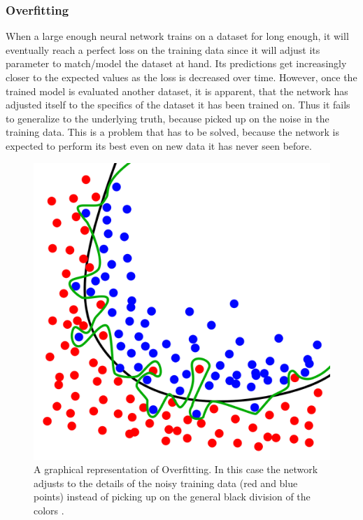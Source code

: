 \documentclass[a4paper,10pt]{scrartcl}
\begin{document}
\subsubsection*{Overfitting}

When a large enough neural network trains on a dataset for long enough, it will eventually reach a perfect loss on the training data since it will adjust its parameter to match/model the dataset at hand.
Its predictions get increasingly closer to the expected values as the loss is decreased over time.
However, once the trained model is evaluated another dataset, it is apparent, that the network has adjusted itself to the specifics of the dataset it has been trained on.
Thus it fails to generalize to the underlying truth, because picked up on the noise in the training data.
This is a problem that has to be solved, because the network is expected to perform its best even on new data it has never seen before.

\begin{figure}[h]
    \includegraphics[scale=0.15]{images/Overfitting.svg.png}
    \centering
    \caption{A graphical representation of Overfitting. In this case the network adjusts to the details of the noisy training data (red and blue points) instead of picking up on the general black division of the colors \cite{wiki:Overfitting}.}
    \label{fig:overfitting}
\end{figure}
\end{document}
